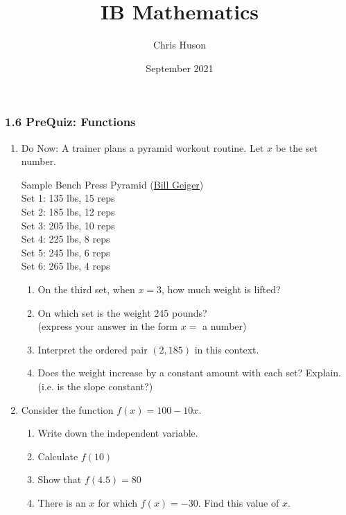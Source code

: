 \documentclass[12pt, twoside]{article}
\title{IB Mathematics}
\author{Chris Huson}
\date{September 2021}
\begin{document}
\subsubsection*{1.6 PreQuiz: Functions}
\begin{enumerate}
  \item Do Now: A trainer plans a pyramid workout routine. Let $x$ be the set number.
  \begin{center}
      Sample Bench Press Pyramid 
      (\href{https://www.bodybuilding.com/content/build-muscle-and-strength-with-pyramid-training.html}{Bill Geiger})\\
        Set 1: 135 lbs, 15 reps\\
        Set 2: 185 lbs, 12 reps\\
        Set 3: 205 lbs, 10 reps\\
        Set 4: 225 lbs, 8 reps\\
        Set 5: 245 lbs, 6 reps\\
        Set 6: 265 lbs, 4 reps
  \end{center}
\begin{enumerate}[itemsep=0.5cm]
  \item On the third set, when $x=3$, how much weight is lifted?
  \item On which set is the weight 245 pounds? \\(express your answer in the form $x=$ a number)
  \item Interpret the ordered pair $(2,185)$ in this context.\vspace{2cm}
  \item Does the weight increase by a constant amount with each set? Explain. \\(i.e. is the slope constant?) \vspace{1cm}
\end{enumerate}

\item Consider the function $f(x)=100 - 10x$.
\begin{enumerate}[itemsep=0.5cm]
  \item Write down the independent variable.
  \item Calculate $f(10)$ \vspace{1cm}
  \item Show that $f(4.5)=80$ \vspace{1.5cm}
  \item There is an $x$ for which $f(x)= -30$. Find this value of $x$.
\end{enumerate} \vspace{2cm}


\end{enumerate}
\end{document}
